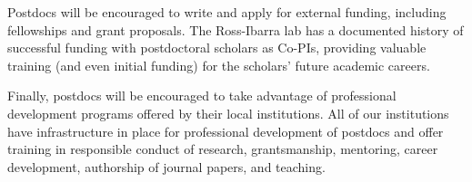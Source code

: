 Postdocs will be encouraged to write and apply for external funding, including fellowships and grant proposals.  The Ross-Ibarra lab has a documented history of successful funding with postdoctoral scholars as Co-PIs, providing valuable training (and even initial funding) for the scholars' future academic careers.

Finally, postdocs will be encouraged to take advantage of professional development programs offered by their local institutions. All of our institutions have infrastructure in place for professional development of postdocs and offer training in responsible conduct of research, grantsmanship, mentoring, career development, authorship of journal papers, and teaching.